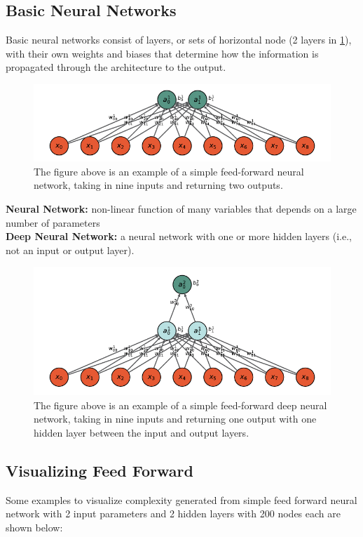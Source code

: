 \subsection{Basic Neural Networks}

Basic neural networks consist of layers, or sets of horizontal node (2 layers in \cref*{fig:basic_NN}), with their own weights and biases that determine how the information is propagated through the architecture to the output. 

\begin{figure}[H]
\centering
\includegraphics{../figures/neural_network.pdf}
\caption{The figure above is an example of a simple feed-forward neural network, taking in nine inputs and returning two outputs.}
\label{fig:basic_NN}
\end{figure}

\noindent \textbf{Neural Network:} non-linear function of many variables that depends on a large number of parameters \\
\textbf{Deep Neural Network:} a neural network with one or more hidden layers (i.e., not an input or output layer).

\begin{figure}[H]
\centering
\includegraphics{../figures/DNN.pdf}
\caption{The figure above is an example of a simple feed-forward deep neural network, taking in nine inputs and returning one output with one hidden layer between the input and output layers.}
\end{figure}
			
\subsection{Visualizing Feed Forward}
Some examples to visualize complexity generated from simple feed forward neural network with 2 input parameters and 2 hidden layers with 200 nodes each are shown below:

